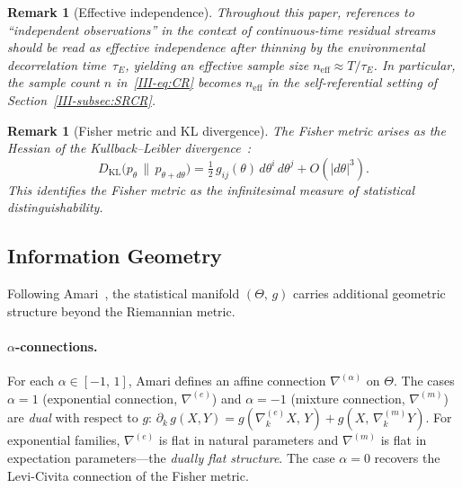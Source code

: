 \documentclass[12pt,a4paper,openany]{book}
\newtheorem{remark}[theorem]{Remark}
\begin{document}
\begin{remark}[Effective independence]
\label{III-rem:effective_independence}
Throughout this paper, references to ``independent
observations'' in the context of continuous-time residual
streams should be read as \emph{effective independence}
after thinning by the environmental decorrelation
time~$\tau_E$, yielding an effective sample size
$n_{\mathrm{eff}} \approx T/\tau_E$.
In particular, the sample count $n$ in~\eqref{III-eq:CR}
becomes $n_{\mathrm{eff}}$ in the self-referential
setting of Section~\ref{III-subsec:SRCR}.
\end{remark}

\begin{remark}[Fisher metric and KL divergence]
\label{III-rem:fisher_KL}
The Fisher metric arises as the Hessian of the
Kullback--Leibler divergence~\cite{CoverThomas2006}:
\begin{equation}
\label{III-eq:fisher_KL}
D_{\mathrm{KL}}\bigl(p_\theta \,\|\, p_{\theta+d\theta}\bigr)
= \tfrac{1}{2}\,g_{ij}(\theta)\,d\theta^i\,d\theta^j
  + O\!\left(|d\theta|^3\right).
\end{equation}
This identifies the Fisher metric as the infinitesimal
measure of statistical distinguishability.
\end{remark}

\subsection{Information Geometry}
\label{III-subsec:info_geom}

Following Amari~\cite{Amari1985,AmariNagaoka2000}, the
statistical manifold $(\Theta,\,g)$ carries additional
geometric structure beyond the Riemannian metric.

\paragraph{$\alpha$-connections.}
For each $\alpha \in [-1,\,1]$, Amari defines an affine
connection $\nabla^{(\alpha)}$ on $\Theta$.
The cases $\alpha = 1$ (exponential connection,
$\nabla^{(e)}$) and $\alpha = -1$ (mixture connection,
$\nabla^{(m)}$) are \emph{dual} with respect to $g$:
$\partial_k\,g(X,Y)
= g(\nabla_k^{(e)}X,\,Y)
+ g(X,\,\nabla_k^{(m)}Y)$.
For exponential families, $\nabla^{(e)}$ is flat in natural
parameters and $\nabla^{(m)}$ is flat in expectation
parameters---the \emph{dually flat structure}.
The case $\alpha = 0$ recovers the Levi-Civita connection of
the Fisher metric.
\end{document}
